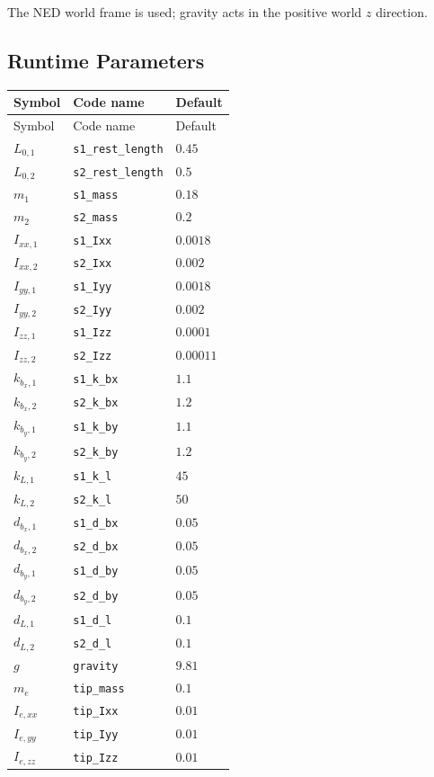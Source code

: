 \documentclass[11pt]{article}
\begin{document}
The NED world frame is used; gravity acts in the positive world $z$ direction.
\subsection{Runtime Parameters}
\begin{longtable}{lll}
\hline
Symbol & Code name & Default \\
\hline
\endfirsthead
\hline Symbol & Code name & Default \\
\hline
\endhead
$L_{0,1}$ & \texttt{s1\_rest\_length} & $0.45$ \\
$L_{0,2}$ & \texttt{s2\_rest\_length} & $0.5$ \\
$m_{1}$ & \texttt{s1\_mass} & $0.18$ \\
$m_{2}$ & \texttt{s2\_mass} & $0.2$ \\
$I_{xx,1}$ & \texttt{s1\_Ixx} & $0.0018$ \\
$I_{xx,2}$ & \texttt{s2\_Ixx} & $0.002$ \\
$I_{yy,1}$ & \texttt{s1\_Iyy} & $0.0018$ \\
$I_{yy,2}$ & \texttt{s2\_Iyy} & $0.002$ \\
$I_{zz,1}$ & \texttt{s1\_Izz} & $0.0001$ \\
$I_{zz,2}$ & \texttt{s2\_Izz} & $0.00011$ \\
$k_{b_x,1}$ & \texttt{s1\_k\_bx} & $1.1$ \\
$k_{b_x,2}$ & \texttt{s2\_k\_bx} & $1.2$ \\
$k_{b_y,1}$ & \texttt{s1\_k\_by} & $1.1$ \\
$k_{b_y,2}$ & \texttt{s2\_k\_by} & $1.2$ \\
$k_{L,1}$ & \texttt{s1\_k\_l} & $45$ \\
$k_{L,2}$ & \texttt{s2\_k\_l} & $50$ \\
$d_{b_x,1}$ & \texttt{s1\_d\_bx} & $0.05$ \\
$d_{b_x,2}$ & \texttt{s2\_d\_bx} & $0.05$ \\
$d_{b_y,1}$ & \texttt{s1\_d\_by} & $0.05$ \\
$d_{b_y,2}$ & \texttt{s2\_d\_by} & $0.05$ \\
$d_{L,1}$ & \texttt{s1\_d\_l} & $0.1$ \\
$d_{L,2}$ & \texttt{s2\_d\_l} & $0.1$ \\
$g$ & \texttt{gravity} & $9.81$ \\
$m_e$ & \texttt{tip\_mass} & $0.1$ \\
$I_{e,xx}$ & \texttt{tip\_Ixx} & $0.01$ \\
$I_{e,yy}$ & \texttt{tip\_Iyy} & $0.01$ \\
$I_{e,zz}$ & \texttt{tip\_Izz} & $0.01$ \\
\hline
\end{longtable}
\end{document}
